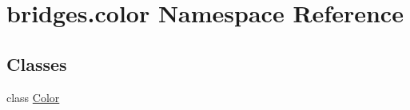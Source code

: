 \hypertarget{namespacebridges_1_1color}{}\section{bridges.\+color Namespace Reference}
\label{namespacebridges_1_1color}
\subsection*{Classes}
\begin{DoxyCompactItemize}
\item 
class \mbox{\hyperlink{classbridges_1_1color_1_1_color}{Color}}
\end{DoxyCompactItemize}
